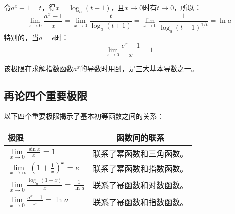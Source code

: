 令$a^x-1=t$，得$x=\log _a\left( t+1 \right) $，且$x\rightarrow 0$时有$t\rightarrow 0$，所以：
\[
\underset{x\rightarrow 0}{\lim}\frac{a^x-1}{x}=\underset{x\rightarrow 0}{\lim}\frac{t}{\log _a\left( t+1 \right)}=\underset{x\rightarrow 0}{\lim}\frac{1}{\log _a\left( t+1 \right) ^{1/t}}=\ln a
\]
特别的，当$a=e$时：
\[
\underset{x\rightarrow 0}{\lim}\frac{e^x-1}{x}=1
\]

\begin{tcolorbox}
该极限在求解指数函数$a^x$的导数时用到，是三大基本导数之一。
\end{tcolorbox}

\subsection{再论四个重要极限}

以下四个重要极限揭示了基本初等函数之间的关系：

\begin{table}[h]
\centering
\begin{tabular}{lc}
    \toprule
    极限 & 函数间的联系\\
    \midrule
    $\underset{x\rightarrow 0}{\lim}\frac{\sin x}{x}=1$ & 联系了幂函数和三角函数。\\
    $\underset{x\rightarrow \infty}{\lim}\left( 1+\frac{1}{x} \right) ^x=e$ & 联系了幂函数和指数函数。\\
    $\underset{x\rightarrow 0}{\lim}\frac{\log _a\left( 1+x \right)}{x}=\frac{1}{\ln a}$ & 联系了幂函数和对数函数。\\
    $\underset{x\rightarrow 0}{\lim}\frac{a^x-1}{x}=\ln a$ & 联系了幂函数和指数函数。\\
    \bottomrule
\end{tabular}
\end{table}




